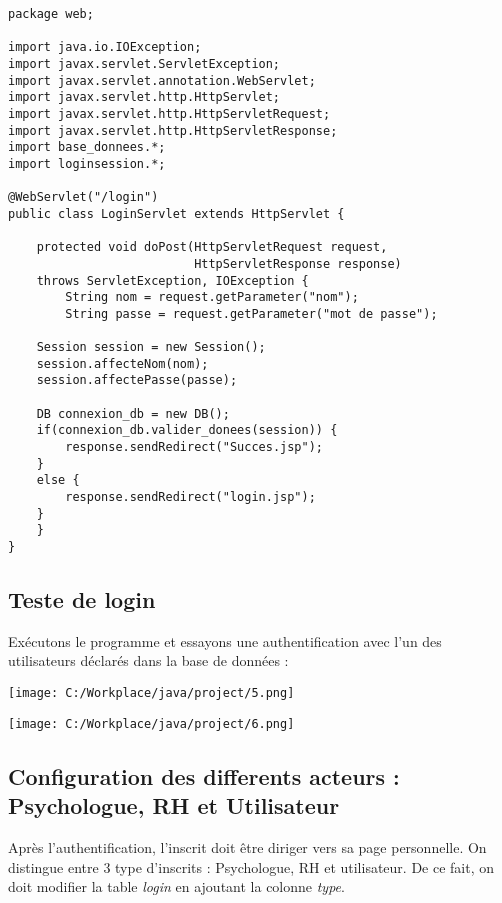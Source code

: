 \documentclass[12]{article}
\begin{document}
\lstset{language=java}
\begin{lstlisting}
package web;

import java.io.IOException;
import javax.servlet.ServletException;
import javax.servlet.annotation.WebServlet;
import javax.servlet.http.HttpServlet;
import javax.servlet.http.HttpServletRequest;
import javax.servlet.http.HttpServletResponse;
import base_donnees.*;
import loginsession.*;

@WebServlet("/login")
public class LoginServlet extends HttpServlet {
	
	protected void doPost(HttpServletRequest request, 
						  HttpServletResponse response) 
	throws ServletException, IOException {
		String nom = request.getParameter("nom");
		String passe = request.getParameter("mot de passe");
		
	Session session = new Session();
	session.affecteNom(nom);
	session.affectePasse(passe);
	
	DB connexion_db = new DB();
	if(connexion_db.valider_donees(session)) {
		response.sendRedirect("Succes.jsp");
	}
	else {
		response.sendRedirect("login.jsp");
	}
	}
}

\end{lstlisting}



\subsection{Teste de login}

Exécutons le programme et essayons une authentification avec l'un des utilisateurs déclarés dans la base de données :\\

\begin{center}
\texttt{[image: C:/Workplace/java/project/5.png]}
\end{center}

\begin{center}
\texttt{[image: C:/Workplace/java/project/6.png]}
\end{center}


\subsection{Configuration des differents acteurs : Psychologue, RH et Utilisateur }

Après l'authentification, l'inscrit doit être diriger vers sa page personnelle. On distingue entre 3 type d'inscrits : Psychologue, RH et utilisateur. De ce fait, on doit modifier la table \textit{login} en ajoutant la colonne \textit{type}.\\
\end{document}
